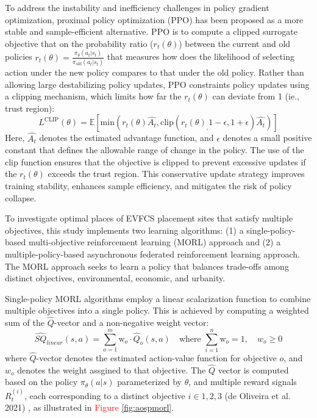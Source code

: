 \documentclass[preprint,12pt]{elsarticle}
\begin{document}
To address the instability and inefficiency challenges in policy gradient optimization, proximal policy optimization (PPO) has been proposed as a more stable and sample-efficient alternative. PPO is to compute a clipped surrogate objective that on the probability ratio ($r_t(\theta)$) between the current and old policies $r_t(\theta)=\frac{\pi_\theta(a_t|s_t)}{\pi_{\mathrm{old}}(a_t|s_t)}$ that measures how does the likelihood of selecting action under the new policy compares to that under the old policy. Rather than allowing large destabilizing policy updates, PPO constraints policy updates using a clipping mechanism, which limits how far the $r_t(\theta)$ can deviate from 1 (ie., trust region):
\begin{equation}
    L^{\mathrm{CLIP}}(\theta)=\mathbb{E}[\mathrm{min}(r_t(\theta)\hat{A_t}, \mathrm{clip}(r_t(\theta)_,1-\epsilon, 1+\epsilon)\hat{A_t})]
\end{equation}
Here, $\hat{A_t}$ denotes the estimated advantage function, and $\epsilon$ denotes a small positive constant that defines the allowable range of change in the policy. The use of the clip function ensures that the objective is clipped to prevent excessive updates if the $r_t(\theta)$ exceeds the trust region. This conservative update strategy improves training stability, enhances sample efficiency, and mitigates the risk of policy collapse.

To investigate optimal places of EVFCS placement sites that satisfy multiple objectives, this study implements two learning algorithms: (1) a single-policy-based multi-objective reinforcement learning (MORL) approach and (2) a multiple-policy-based asynchronous federated reinforcement learning approach. The MORL approach seeks to learn a policy that balances trade-offs among distinct objectives, environmental, economic, and urbanity.

Single-policy MORL algorithms employ a linear scalarization function to combine multiple objectives into a single policy. This is achieved by computing a weighted sum of the $\hat{Q}$-vector and a non-negative weight vector:
\begin{equation}
    \hat{SQ}_{linear}(s,a) =\sum_{o=1}^{m}\mathrm{w}_o\cdot\hat{Q}_o(s,a) \quad \text{where } \sum_{i=1}^{n} \mathrm{w}_o = 1, \quad w_o \geq 0
\end{equation}
where $\hat{Q}$-vector denotes the estimated action-value function for objective $o$, and $w_o$ denotes the weight assgined to that objective. The $\hat{Q}$ vector is computed based on the policy $\pi_\theta(a|s)$ parameterized by $\theta$, and multiple reward signals $R_t^{(i)}$, each corresponding to a distinct objective $i \in {1,2,3}$ (de Oliveira et al. 2021) \cite{Oliveira2021}, as illustrated in \textcolor{red}{Figure} \ref{fig:aospmorl}. 
\end{document}
